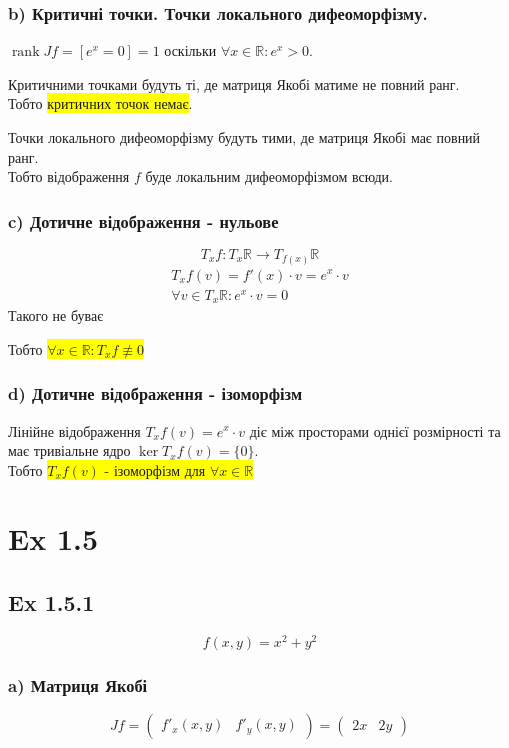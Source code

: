 \documentclass[10pt, a4paper]{article} %
\newcommand{\R}{\mathbb{R}}
\newcommand{\J}{J}
\DeclareMathOperator{\rank}{rank}
\begin{document}
\subsubsection*{b) Критичні точки. Точки локального дифеоморфізму.}
$\rank Jf = [e^x = 0] = 1$ оскільки $\forall x\in\R: e^x > 0$.

Критичними точками будуть ті, де матриця Якобі матиме не повний ранг.\\
Тобто \colorbox{yellow}{критичних точок немає}.

Точки локального дифеоморфізму будуть тими, де матриця Якобі має повний ранг.\\
Тобто відображення $f$ буде локальним дифеоморфізмом всюди.

\subsubsection*{c) Дотичне відображення - нульове}
\[T_{x}f : T_{x}\R \to T_{f(x)}\R\]
\begin{gather*}
    T_{x}f(v) = f'(x) \cdot v = e^x \cdot v\\
    \forall v\in T_{x}\R: e^x \cdot v = 0
\end{gather*}
Такого не буває

Тобто \colorbox{yellow}{$\forall x\in\R: T_{x}f \nequiv 0$}

\subsubsection*{d) Дотичне відображення - ізоморфізм}

Лінійне відображення $T_{x}f(v) = e^x \cdot v$ діє між просторами однієї розмірності та має тривіальне ядро $\ker T_{x}f(v) = \{0\}$. \\
Тобто \colorbox{yellow}{$T_{x}f(v)$ - ізоморфізм для $\forall x\in \R$}


\section*{Ex 1.5}
\subsection*{Ex 1.5.1}
\begin{mdframed}
    \[f(x,y) = x^2 + y^2\]
\end{mdframed}

\subsubsection*{a) Матриця Якобі}
\[\J f = \begin{pmatrix}
    f'_x(x,y) & f'_y(x,y)
\end{pmatrix} = \begin{pmatrix}
    2x & 2y
\end{pmatrix}\]
\end{document}
